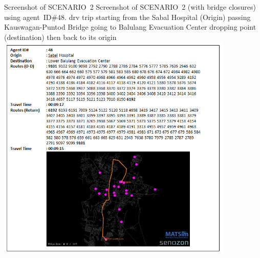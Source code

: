 \createfigure%
{Screenshot of SCENARIO~2}%
{Screenshot of SCENARIO~2 (with bridge closures) using agent~ID\#48. \protect\gls{drv} trip starting from the Sabal Hospital (Origin) passing Kauswagan-Puntod Bridge going to Balulang Evacuation Center dropping point (destination) then back to its origin}%
{\label{fig:philippines_fig5}}%
{\includegraphics[width=0.85\textwidth, angle=0]{./scenarios/figures/philippines_fig5.png}}%
{}







 
